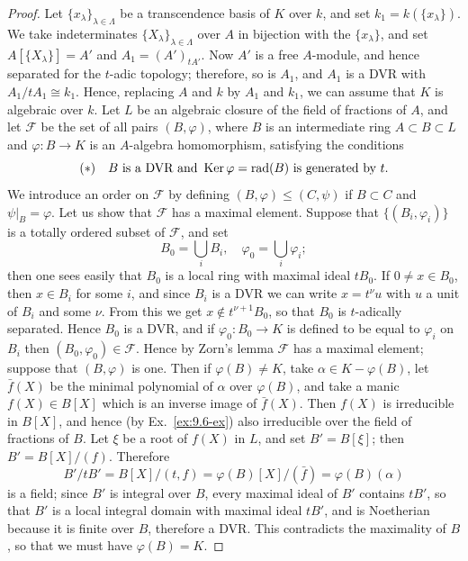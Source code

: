 \begin{proof}
Let $\{x_\lambda\}_{\lambda \in \Lambda}$ be a transcendence basis of $K$ over $k$, and set
$k_1 = k(\{x_\lambda\})$. We take indeterminates $\{X_\lambda\}_{\lambda \in \Lambda}$ over $A$ in
bijection with the $\{x_\lambda\}$, and set $A[\{X_\lambda\}] = A'$ and $A_1 = (A')_{tA'}$. Now
$A'$ is a free $A$-module, and hence separated for the $t$-adic topology; therefore,
so is $A_1$, and $A_1$ is a DVR with $A_1/tA_1 \cong k_1$. Hence, replacing $A$ and $k$ by $A_1$
and $k_1$, we can assume that $K$ is algebraic over $k$. Let $L$ be an algebraic
closure of the field of fractions of $A$, and let $\mathcal{F}$ be the set of all pairs
$(B, \varphi)$, where $B$ is an intermediate ring $A \subset B \subset L$ and
$\varphi\colon B \to K$ is an $A$-algebra homomorphism, satisfying the conditions
\[
  (*) \quad B \text{ is a DVR and } \operatorname{Ker} \varphi = \operatorname{rad}(B) \text{ is generated by } t.
\]
We introduce an order on $\mathcal{F}$ by defining $(B, \varphi) \le (C, \psi)$ if $B \subset C$ and
$\psi|_B = \varphi$. Let us show that $\mathcal{F}$ has a maximal element. Suppose that
$\{(B_i, \varphi_i)\}$ is a totally ordered subset of $\mathcal{F}$, and set
\[
  B_0 = \bigcup_i B_i, \quad \varphi_0 = \bigcup_i \varphi_i;
\]
then one sees easily that $B_0$ is a local ring with maximal ideal $tB_0$. If
$0 \ne x \in B_0$, then $x \in B_i$ for some $i$, and since $B_i$ is a DVR we can write
$x = t^\nu u$ with $u$ a unit of $B_i$ and some $\nu$. From this we get
$x \notin t^{\nu+1}B_0$, so that $B_0$ is $t$-adically separated. Hence $B_0$ is a DVR, and if
$\varphi_0\colon B_0 \to K$ is defined to be equal to $\varphi_i$ on $B_i$ then
$(B_0, \varphi_0) \in \mathcal{F}$. Hence by Zorn's lemma $\mathcal{F}$ has a maximal element;
suppose that $(B, \varphi)$ is one. Then if $\varphi(B) \ne K$, take $\alpha \in K - \varphi(B)$,
let $\bar{f}(X)$ be the minimal polynomial of $\alpha$ over $\varphi(B)$, and take a manic
$f(X) \in B[X]$ which is an inverse image of $\bar{f}(X)$. Then $f(X)$ is irreducible in
$B[X]$, and hence (by Ex.~\ref{ex:9.6-ex}) also irreducible over the field of fractions of
$B$. Let $\xi$ be a root of $f(X)$ in $L$, and set $B' = B[\xi]$; then
$B' = B[X]/(f)$. Therefore
\[
  B'/tB' = B[X]/(t, f) = \varphi(B)[X]/(\bar{f}) = \varphi(B)(\alpha)
\]
is a field; since $B'$ is integral over $B$, every maximal ideal of $B'$ contains
$tB'$, so that $B'$ is a local integral domain with maximal ideal $tB'$, and is
Noetherian because it is finite over $B$, therefore a DVR. This contradicts the
maximality of $B$, so that we must have $\varphi(B) = K$.
\end{proof}

